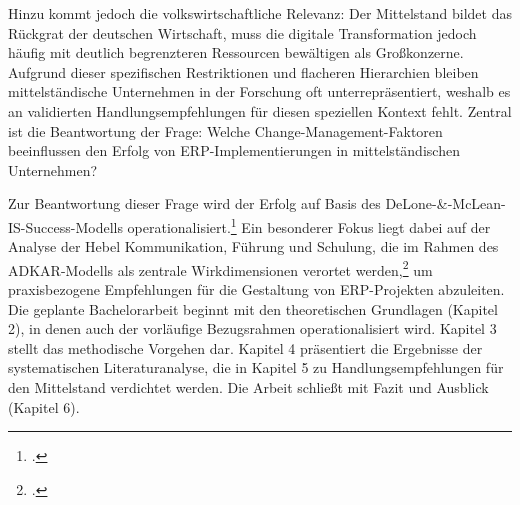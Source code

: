 Hinzu kommt jedoch die volkswirtschaftliche Relevanz: Der Mittelstand bildet das Rückgrat der deutschen Wirtschaft, muss die digitale Transformation jedoch häufig mit deutlich begrenzteren Ressourcen bewältigen als Gro\ss{}konzerne. Aufgrund dieser spezifischen Restriktionen und flacheren Hierarchien bleiben mittelständische Unternehmen in der Forschung oft unterrepräsentiert, weshalb es an validierten Handlungsempfehlungen für diesen speziellen Kontext fehlt. Zentral ist die Beantwortung der Frage: Welche Change-Management-Faktoren beeinflussen den Erfolg von ERP-Implementierungen in mittelständischen Unternehmen?

Zur Beantwortung dieser Frage wird der Erfolg auf Basis des DeLone-\&-McLean-IS-Success-Modells operationalisiert.\footcite[Vgl.][S.~13--16]{delone2003} Ein besonderer Fokus liegt dabei auf der Analyse der Hebel Kommunikation, Führung und Schulung, die im Rahmen des ADKAR-Modells als zentrale Wirkdimensionen verortet werden,\footcite[Vgl.][S.~126--127]{galli2018} um praxisbezogene Empfehlungen für die Gestaltung von ERP-Projekten abzuleiten. Die geplante Bachelorarbeit beginnt mit den theoretischen Grundlagen (Kapitel 2), in denen auch der vorl\"aufige Bezugsrahmen operationalisiert wird. Kapitel 3 stellt das methodische Vorgehen dar. Kapitel 4 pr\"asentiert die Ergebnisse der systematischen Literaturanalyse, die in Kapitel 5 zu Handlungsempfehlungen f\"ur den Mittelstand verdichtet werden. Die Arbeit schlie\ss{}t mit Fazit und Ausblick (Kapitel 6).

